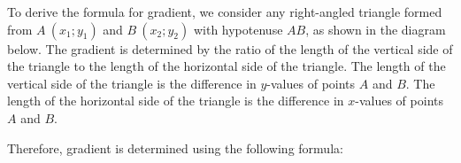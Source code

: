 \setcounter{subfigure}{0}
\begin{figure}[H] %
\begin{center}
\end{center}
\end{figure}        
To derive the formula for gradient, we consider any right-angled triangle formed from $A~(x_1;y_1)$ and $B~(x_2;y_2)$ with hypotenuse $AB$, as shown in the diagram below. The gradient is determined by the ratio of the length of the vertical side of the triangle to the length of the horizontal side of the triangle. The length of the vertical side of the triangle is the difference in $y$-values of points $A$ and $B$. The length of the horizontal side of the triangle is the difference in $x$-values of points $A$ and $B$. 
\setcounter{subfigure}{0}
\begin{figure}[H] %
\begin{center}
\end{center}
\end{figure}  
Therefore, gradient is determined using the following formula:


